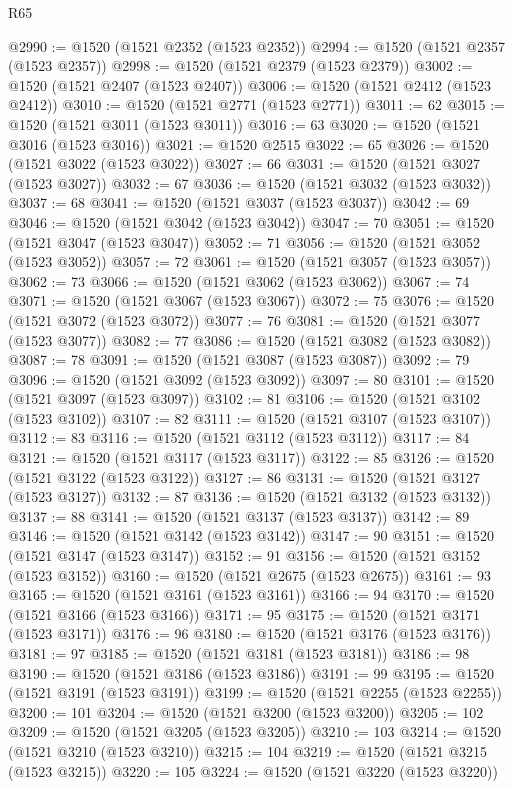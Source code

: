 \begin{lexlean}{R65}
\begin{coremodule}
{@2990 := @1520 (@1521 @2352 (@1523 @2352))
@2994 := @1520 (@1521 @2357 (@1523 @2357))
@2998 := @1520 (@1521 @2379 (@1523 @2379))
@3002 := @1520 (@1521 @2407 (@1523 @2407))
@3006 := @1520 (@1521 @2412 (@1523 @2412))
@3010 := @1520 (@1521 @2771 (@1523 @2771))
@3011 := 62
@3015 := @1520 (@1521 @3011 (@1523 @3011))
@3016 := 63
@3020 := @1520 (@1521 @3016 (@1523 @3016))
@3021 := @1520 @2515
@3022 := 65
@3026 := @1520 (@1521 @3022 (@1523 @3022))
@3027 := 66
@3031 := @1520 (@1521 @3027 (@1523 @3027))
@3032 := 67
@3036 := @1520 (@1521 @3032 (@1523 @3032))
@3037 := 68
@3041 := @1520 (@1521 @3037 (@1523 @3037))
@3042 := 69
@3046 := @1520 (@1521 @3042 (@1523 @3042))
@3047 := 70
@3051 := @1520 (@1521 @3047 (@1523 @3047))
@3052 := 71
@3056 := @1520 (@1521 @3052 (@1523 @3052))
@3057 := 72
@3061 := @1520 (@1521 @3057 (@1523 @3057))
@3062 := 73
@3066 := @1520 (@1521 @3062 (@1523 @3062))
@3067 := 74
@3071 := @1520 (@1521 @3067 (@1523 @3067))
@3072 := 75
@3076 := @1520 (@1521 @3072 (@1523 @3072))
@3077 := 76
@3081 := @1520 (@1521 @3077 (@1523 @3077))
@3082 := 77
@3086 := @1520 (@1521 @3082 (@1523 @3082))
@3087 := 78
@3091 := @1520 (@1521 @3087 (@1523 @3087))
@3092 := 79
@3096 := @1520 (@1521 @3092 (@1523 @3092))
@3097 := 80
@3101 := @1520 (@1521 @3097 (@1523 @3097))
@3102 := 81
@3106 := @1520 (@1521 @3102 (@1523 @3102))
@3107 := 82
@3111 := @1520 (@1521 @3107 (@1523 @3107))
@3112 := 83
@3116 := @1520 (@1521 @3112 (@1523 @3112))
@3117 := 84
@3121 := @1520 (@1521 @3117 (@1523 @3117))
@3122 := 85
@3126 := @1520 (@1521 @3122 (@1523 @3122))
@3127 := 86
@3131 := @1520 (@1521 @3127 (@1523 @3127))
@3132 := 87
@3136 := @1520 (@1521 @3132 (@1523 @3132))
@3137 := 88
@3141 := @1520 (@1521 @3137 (@1523 @3137))
@3142 := 89
@3146 := @1520 (@1521 @3142 (@1523 @3142))
@3147 := 90
@3151 := @1520 (@1521 @3147 (@1523 @3147))
@3152 := 91
@3156 := @1520 (@1521 @3152 (@1523 @3152))
@3160 := @1520 (@1521 @2675 (@1523 @2675))
@3161 := 93
@3165 := @1520 (@1521 @3161 (@1523 @3161))
@3166 := 94
@3170 := @1520 (@1521 @3166 (@1523 @3166))
@3171 := 95
@3175 := @1520 (@1521 @3171 (@1523 @3171))
@3176 := 96
@3180 := @1520 (@1521 @3176 (@1523 @3176))
@3181 := 97
@3185 := @1520 (@1521 @3181 (@1523 @3181))
@3186 := 98
@3190 := @1520 (@1521 @3186 (@1523 @3186))
@3191 := 99
@3195 := @1520 (@1521 @3191 (@1523 @3191))
@3199 := @1520 (@1521 @2255 (@1523 @2255))
@3200 := 101
@3204 := @1520 (@1521 @3200 (@1523 @3200))
@3205 := 102
@3209 := @1520 (@1521 @3205 (@1523 @3205))
@3210 := 103
@3214 := @1520 (@1521 @3210 (@1523 @3210))
@3215 := 104
@3219 := @1520 (@1521 @3215 (@1523 @3215))
@3220 := 105
@3224 := @1520 (@1521 @3220 (@1523 @3220))
}
\end{coremodule}
\end{lexlean}
